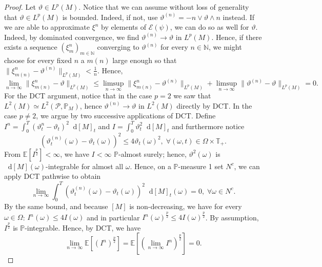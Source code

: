 \documentclass[11pt,a4paper,twoside,openany]{report}
\newcommand{\diff}{\mathop{}\!\mathrm{d}}
\theoremstyle{plain} %
\theoremstyle{definition} %
\theoremstyle{remark} %
\begin{document}
\begin{proof}
Let \(\vartheta\in L^p(M)\). Notice that we can assume without loss of generality that \(\vartheta\in L^p(M)\) is bounded. Indeed, if not, use \(\vartheta^{(n)}=-n\vee \vartheta\wedge n\) instead. If we are able to approximate \(\xi^n\) by elements of \(\mathcal{E}(\psi)\), we can do so as well for \(\vartheta\). Indeed, by dominated convergence, we find \(\vartheta^{(n)}\to \vartheta\) in \(L^p(M)\). Hence, if there exists a sequence \((\xi^n_m)_{m\in\mathbb{N}}\) converging to \(\vartheta^{(n)}\) for every \(n\in\mathbb{N}\), we might choose for every fixed \(n\) a \(m(n)\) large enough so that \(\lVert \xi^n_{m(n)}-\vartheta^{(n)}\rVert_{L^p(M)}<\frac{1}{n}\). Hence, 
\begin{equation*}
    \lim_{n\to\infty}\lVert\xi^n_{m(n)}-\vartheta\rVert_{L^p(M)}\leq\limsup_{n\to\infty}\lVert\xi^n_{m(n)}-\vartheta^{(n)}\rVert_{L^p(M)}+\limsup_{n\to\infty}\lVert\vartheta^{(n)}-\vartheta\rVert_{L^p(M)}=0.
\end{equation*}
For the DCT argument, notice that in the case \(p=2\) we saw that \(L^2(M)\simeq L^2(\mathcal{P},\mathbb{P}_M)\), hence \(\vartheta^{(n)}\to\vartheta\) in \(L^2(M)\) directly by DCT. In the case \(p\neq 2\), we argue by two successive applications of DCT.
 Define \(I^n=\int_0^T(\vartheta^n_t-\vartheta_t)^2\diff[M]_t\) and \(I=\int_0^T\vartheta_t^2\diff[M]_t\) and furthermore notice
 \begin{equation*}
     (\vartheta_t^{(n)}(\omega)-\vartheta_t(\omega))^2\leq 4\vartheta_t(\omega)^2,\;\forall(\omega,t)\in\Omega\times\mathbb{T}_+.
 \end{equation*}
 From \(\mathbb{E}[I^{\frac{p}{2}}]<\infty\), we have \(I<\infty\) \(\mathbb{P}\)-almost surely; hence, \(\vartheta^2(\omega)\) is \(\diff [M](\omega)\)-integrable for almost all \(\omega\). Hence, on a \(\mathbb{P}\)-measure 1 set \(N^c\), we can apply DCT pathwise to obtain
 \begin{equation*}
     \lim_{n\to\infty}\int_0^T(\vartheta^{(n)}_t(\omega)-\vartheta_t(\omega))^2\diff [M]_t(\omega)=0,\;\forall\omega\in N^c.
 \end{equation*}
 By the same bound, and because \([M]\) is non-decreasing, we have for every \(\omega\in\Omega\): \(I^n(\omega)\leq 4 I(\omega)\) and in particular  \(I^n(\omega)^{\frac{p}{2}}\leq 4 I(\omega)^{\frac{p}{2}}\).  By assumption, \(I^{\frac{p}{2}}\) is \(\mathbb{P}\)-integrable. Hence, by DCT, we have 
 \begin{equation*}
  \lim_{n\to\infty}\mathbb{E}[(I^n)^{\frac{p}{2}}]=\mathbb{E}[(\lim_{n\to\infty}I^n)^{\frac{p}{2}}]=0.

\end{equation*}
\end{proof}
\end{document}

